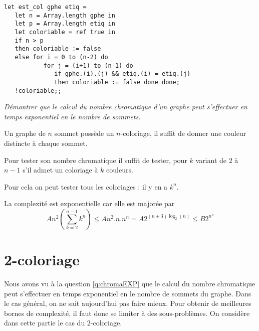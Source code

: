 \begin{Answer}
\begin{lstlisting}
let est_col gphe etiq =
   let n = Array.length gphe in
   let p = Array.length etiq in
   let coloriable = ref true in
   if n > p
   then coloriable := false
   else for i = 0 to (n-2) do
           for j = (i+1) to (n-1) do
              if gphe.(i).(j) && etiq.(i) = etiq.(j)
              then coloriable := false done done;
   !coloriable;;
\end{lstlisting}
\end{Answer}
\begin{Exercise}[label=q:chromaEXP] \it
Démontrer que le calcul du nombre chromatique d'un graphe peut s'effectuer en temps exponentiel en le nombre de sommets. 
\end{Exercise}  
\begin{Answer}
Un graphe de $n$ sommet possède un $n$-coloriage, il suffit de donner une couleur distincte à chaque sommet.

Pour tester son nombre chromatique il suffit de tester, pour $k$ variant de 2 à $n-1$ s'il admet un coloriage à $k$ couleurs. 

Pour cela on peut tester tous les coloriages : il y en a $k^n$.

La complexité est exponentielle car elle est majorée par 
\[An^2\left(\sum_{k=2}^{n-1} k^n\right) \le An^2.n.n^n= A2^{(n+3)\log_2(n)} \le B2^{n^2}\]
\end{Answer}
\section{2-coloriage}
Nous avons vu à la question \ref{q:chromaEXP} que le calcul du nombre chromatique peut s'effectuer en temps exponentiel en le nombre de sommets du graphe. Dans le cas général, on ne sait aujourd'hui pas faire mieux. Pour obtenir de meilleures bornes de complexité, il faut donc se limiter à des sous-problèmes. On considère dans cette partie le cas du $2$-coloriage. 

